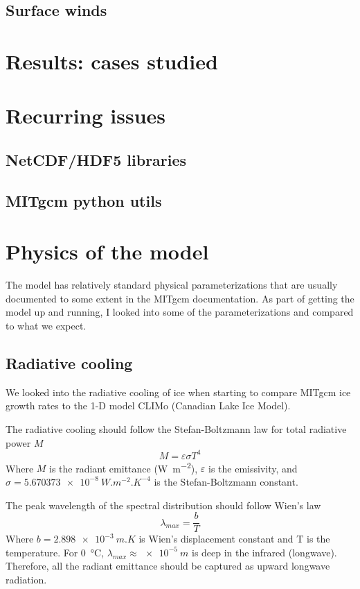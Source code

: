\documentclass[11pt]{article}
\begin{document}
\subsection{Surface winds}



\section{Results: cases studied}




\section{Recurring issues}
\subsection{NetCDF/HDF5 libraries}
\subsection{MITgcm python utils}






\section{Physics of the model}
The model has relatively standard physical parameterizations that are usually documented to some extent in the MITgcm documentation. As part of getting the model up and running, I looked into some of the parameterizations and compared to what we expect.

\subsection{Radiative cooling}
We looked into the radiative cooling of ice when starting to compare MITgcm ice growth rates to the 1-D model CLIMo (Canadian Lake Ice Model).

The radiative cooling should follow the Stefan-Boltzmann law for total radiative power $M$
\begin{equation}
M = \varepsilon \sigma T^4
\end{equation}
Where $M$ is the radiant emittance (\si{W.m^{-2}}), $\varepsilon$ is the emissivity, and $\sigma = \SI{5.670373e-8}{W.m^{-2}.K^{-4}}$ is the Stefan-Boltzmann constant.

The peak wavelength of the spectral distribution should follow Wien's law
\begin{equation}
\lambda_{max} = \frac{b}{T}
\end{equation}
Where $b = \SI{2.898e-3}{m.K}$ is Wien's displacement constant and T is the temperature. For \SI{0}{\celsius}, $\lambda_{max} \approx \SI{e-5}{m}$ is deep in the infrared (longwave). Therefore, all the radiant emittance should be captured as upward longwave radiation.
\end{document}
